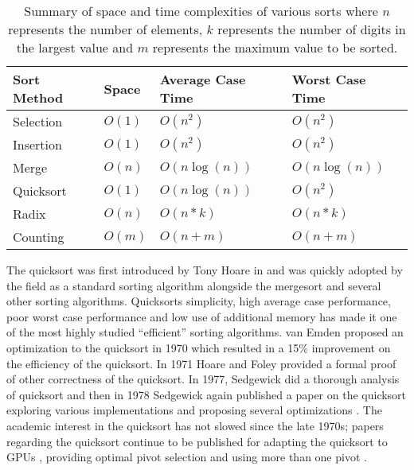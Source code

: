     \begin{table}
        \begin{center}
            \begin{tabular}{|l|l|l|l|}
                    \hline
                    Sort Method &   Space       &   Average Case Time   &   Worst Case Time     \\ \hline \hline
                    Selection   &   $O(1)$      &   $O(n^2)$            &   $O(n^2)$            \\ \hline
                    Insertion   &   $O(1)$      &   $O(n^2)$            &   $O(n^2)$            \\ \hline
                    Merge       &   $O(n)$      &   $O(n\log(n))$       &   $O(n\log(n))$       \\ \hline
                    Quicksort   &   $O(1)$      &   $O(n\log(n))$       &   $O(n^2)$            \\ \hline
                    Radix       &   $O(n)$      &   $O(n*k)$            &   $O(n*k)$            \\ \hline
                    Counting    &   $O(m)$      &   $O(n+m)$            &   $O(n+m)$            \\ \hline
                \end{tabular}
                \caption{Summary of space and time complexities of various sorts where $n$ represents the number of elements, $k$ represents the number of digits in the largest value and $m$ represents the maximum value to be sorted. }
                \label{tab:spaceAndTime}
        \end{center}
    \end{table}

    The quicksort was first introduced by Tony Hoare in \cite{Hoare01011962} and was quickly adopted by the field as a standard sorting algorithm alongside the mergesort \cite{Knuth:1998:ACP:280635} and several other sorting algorithms. Quicksorts simplicity, high average case performance, poor worst case performance and low use of additional memory has made it one of the most highly studied ``efficient'' sorting algorithms. van Emden \cite{van1970increasing} proposed an optimization to the quicksort in 1970 which resulted in a 15\% improvement on the efficiency of the quicksort. In 1971 Hoare and Foley \cite{foley1971proof} provided a formal proof of other correctness of the quicksort. In 1977, Sedgewick did a thorough analysis of quicksort \cite{sedgewick1977analysis} and then in 1978 Sedgewick again published a paper on the quicksort exploring various implementations and proposing several optimizations \cite{sedgewick1978implementing}. The academic interest in the quicksort has not slowed since the late 1970s; papers regarding the quicksort continue to be published for adapting the quicksort to GPUs \cite{cederman2009gpu}, providing optimal pivot selection \cite{martinez2001optimal} and using more than one pivot \cite{edmondson2005m}. 


